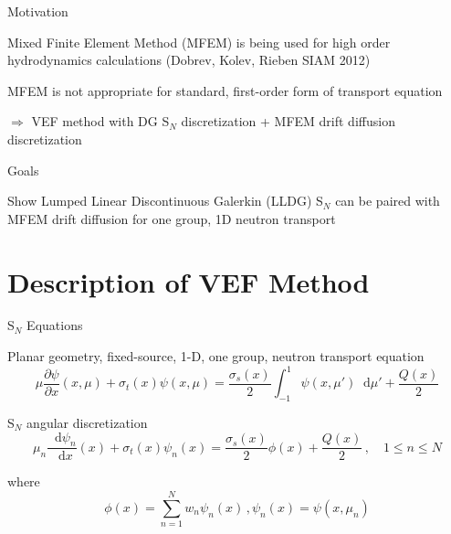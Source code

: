 \documentclass[10pt]{beamer}
\newcommand{\SN}{S$_N$\xspace}
\newcommand{\ud}{\mathop{}\!\mathrm{d}} %
\newcommand{\pderiv}[2]{\frac{\partial #1}{\partial #2}}
\newcommand{\dderiv}[2]{\frac{\ud #1}{\ud #2}}
\newcommand{\paren}[1]{\left(#1\right)}
\begin{document}
\begin{frame}{Motivation}


		Mixed Finite Element Method (MFEM) is being used for high order hydrodynamics calculations (Dobrev, Kolev, Rieben SIAM 2012)

		MFEM is not appropriate for standard, first-order form of transport equation 

		$\Rightarrow$ VEF method with DG \SN discretization + MFEM drift diffusion discretization 


	\vfill
	\begin{alertblock}{Goals}
		
		Show Lumped Linear Discontinuous Galerkin (LLDG) \SN can be paired with MFEM drift diffusion for one group, 1D neutron transport 

	\end{alertblock}

\end{frame}

\section{Description of VEF Method}

\begin{frame}{\SN Equations}

	Planar geometry, fixed-source, 1-D, one group, neutron transport equation 
	\begin{equation*} 
		\mu \pderiv{\psi}{x} \paren{x, \mu} + \sigma_t(x) \psi(x,\mu) = 
			\frac{\sigma_s(x)}{2} \int_{-1}^1 \psi(x,\mu') \ud \mu' + \frac{Q(x)}{2}
	\end{equation*}

	\pause
	\SN angular discretization 
	\begin{equation*} \label{eq:sn}
		\mu_n \dderiv{\psi_n}{x}(x) + \sigma_t(x) \psi_n(x) = 
		\frac{\sigma_s(x)}{2} \phi(x) + \frac{Q(x)}{2} \,, \quad 1 \leq n \leq N
	\end{equation*}

	where 
	\begin{equation*}
		\phi(x) = \sum_{n=1}^N w_n \psi_n(x) \,, \psi_n(x) = \psi(x, \mu_n)
	\end{equation*}

\end{frame}
\end{document}

